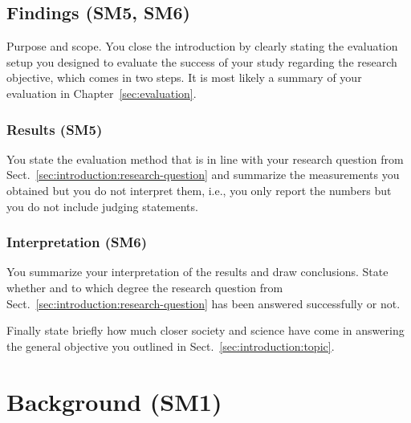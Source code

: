 \documentclass[12pt,a4paper,footinclude=true,twoside,headinclude=true]{report}
\begin{document}
\section{Findings (SM5, SM6)}\label{sec:introduction:results}

\textsf{Purpose and scope}. You close the introduction by clearly stating the evaluation setup you designed to evaluate the success of your study regarding the research objective, which comes in two steps. It is most likely a summary of your evaluation in Chapter~\ref{sec:evaluation}.

\subsection*{Results (SM5)}

You state the evaluation method that is in line with your research question from Sect.~\ref{sec:introduction:research-question} and summarize the measurements you obtained but you do not interpret them, i.e., you only report the numbers but you do not include judging statements.

\subsection*{Interpretation (SM6)}

You summarize your interpretation of the results and draw conclusions. State whether and to which degree the research question from Sect.~\ref{sec:introduction:research-question} has been answered successfully or not. 

Finally state briefly how much closer society and science have come in answering the general objective you outlined in Sect.~\ref{sec:introduction:topic}. 



\chapter{Background (SM1)}\label{sec:background}
\end{document}

